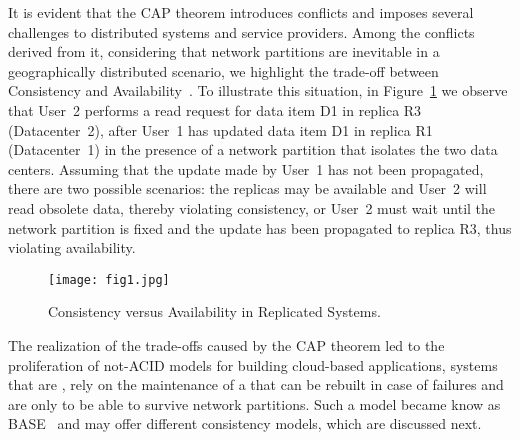 It is evident that %
the CAP theorem introduces conflicts and imposes several challenges to dis\-trib\-uted systems and service providers. Among the conflicts derived from it, considering that network partitions are inevitable in a geographically distributed scenario, we highlight the trade-off between Consistency and Availability~\cite{gilbert2012perspectives}. To illustrate this situation, in Figure~\ref{fig:figure1} we observe that User~2 performs a read request for data item D1 in replica R3 (Da\-ta\-center~2), after User~1 has updated data item D1 in replica R1 (Datacenter~1) in the presence of a network partition that isolates the two data centers. Assuming that the update made by User~1 has not been propagated, there are two possible scenarios: the replicas may be available and User~2 will read obsolete data, thereby violating consistency, or User~2 must wait until the network partition is fixed and the update has been propagated to replica R3, thus violating availability.
\vspace{2mm}

\begin{figure}[h]
\vspace{-2mm}
\centering	\texttt{[image: fig1.jpg]}
\caption{Consistency versus Availability in Replicated Systems.}
\label{fig:figure1}
\end{figure}

\vspace{1mm}
The realization of the trade-offs caused by the CAP theorem led to the proliferation of not-ACID models for building cloud-based applications, {} systems that are {}, rely on the maintenance of a { that can} be rebuilt in case of failures and are only {} to be able to survive network partitions. %
{\al Such a} model became know as BASE~\cite{sosp1997base} and may offer different consistency models, which are discussed next. 
\\



